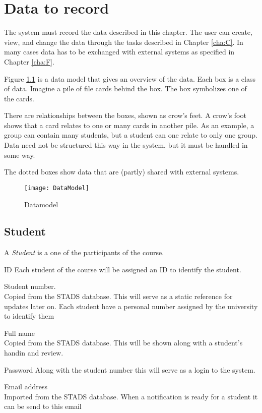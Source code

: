 \documentclass[Main]{subfiles}
\begin{document}
\chapter{Data to record}
The system must record the data described in this chapter. The user can create, view, and change the data through the tasks described in Chapter \ref{cha:C}. 
In many cases data has to be exchanged with external systems as specified in Chapter \ref{cha:F}.

Figure \ref{fig:Datamodel} is a data model that gives an overview of the data. 
Each box is a class of data. 
Imagine a pile of file cards behind the box. 
The box symbolizes one of the cards. 

There are relationships between the boxes, shown as crow's feet. 
A crow's foot shows that a card relates to one or many cards in another pile. 
As an example, a group can contain many students, but a student can one relate to only one group. 
Data need not be structured this way in the system, but it must be handled in some way. 

The dotted boxes show data that are (partly) shared with external systems. 

\begin{figure}[hbtp]
\centering
\texttt{[image: DataModel]}
\caption{Datamodel}
\label{fig:Datamodel}
\end{figure}

\newpage

\section{Student}
A \textit{Student} is a one of the participants of the course.
\begin{DataIntro}
\rExample{}
\end{DataIntro}

\begin{DataTable}
\Record
{ID}
{Each student of the course will be assigned an ID to identify the student.}
{}


\Record
{Student number. 
\\
Copied from the STADS database. 
This will serve as a static reference for updates later on.}
{Each student have a personal number assigned by the university to identify them}
{}

\Record
{Full name\\
Copied from the STADS database.}
{This will be shown along with a student's handin and review.}
{}

\Record
{Password}
{Along with the student number this will serve as a login to the system.}
{}


\Record
{Email address\\
Imported from the STADS database.}
{When a notification is ready for a student it can be send to this email}
{}
\end{DataTable}
\end{document}
